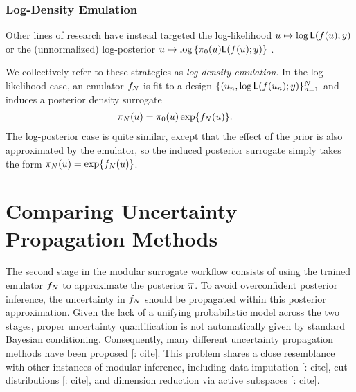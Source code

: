 \documentclass[12pt]{article}
\begin{document}
\subsubsection{Log-Density Emulation}
Other lines of research have instead targeted the log-likelihood $u \mapsto \log \mathsf{L}(f(u); y)$
\citep{VehtariParallelGP,FATES_CES,trainDynamics,quantileApprox,
ActiveLearningMCMC,FerEmulation,StuartTeck1,random_fwd_models,
GP_PDE_priors,OakleyllikEm,JosephMinEnergy,AlawiehIterativeGP}
or the (unnormalized) log-posterior 
$u \mapsto \log \left\{\pi_0(u)\mathsf{L}(f(u); y)\right\}$
\citep{emPostDens,Kandasamy_2017,llikRBF,gp_surrogates_random_exploration,
landslideCalibration}.

We collectively refer to these strategies as \textit{log-density emulation}. In the 
log-likelihood case, an emulator $f_{N}$ is fit to a design 
$\{(u_n, \log \mathsf{L}(f(u_n); y)\}_{n=1}^{N}$
and induces a posterior density surrogate 
\begin{align}
\pi_{N}(u) &= \pi_0(u) \exp\mathopen{}\left\{f_{N}(u)\right\}\mathclose{}. \label{eq:post-em-llik}
\end{align}
The log-posterior case is quite similar, except that the effect of the prior is also 
approximated by the emulator, so the induced posterior surrogate simply takes 
the form $\pi_{N}(u) = \exp\mathopen{}\left\{f_{N}(u)\right\}\mathclose{}$.

\section{Comparing Uncertainty Propagation Methods}
The second stage in the modular surrogate workflow consists of using the 
trained emulator $f_{N}$ to approximate the posterior $\overline{\pi}$.
To avoid overconfident posterior inference, the uncertainty in $f_{N}$
should be propagated within this posterior approximation. Given the lack of
a unifying probabilistic model across the two stages, proper uncertainty 
quantification is not automatically given by standard Bayesian conditioning.
Consequently, many different uncertainty propagation methods have been 
proposed [\todo: cite]. This problem shares a close resemblance with other 
instances of modular inference, including data imputation [\todo: cite],
cut distributions [\todo: cite], and dimension reduction via active subspaces [\todo: cite].
\end{document}
